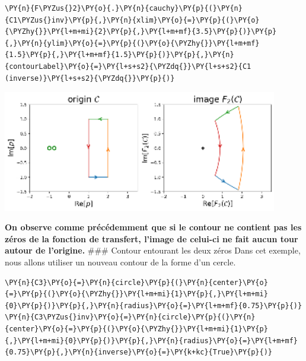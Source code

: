 \begin{tcolorbox}[breakable, size=fbox, boxrule=1pt, pad at break*=1mm,colback=cellbackground, colframe=cellborder]
\begin{Verbatim}[commandchars=\\\{\}]
\PY{n}{F\PYZus{}2}\PY{o}{.}\PY{n}{cauchy}\PY{p}{(}\PY{n}{C1\PYZus{}inv}\PY{p}{,}\PY{n}{xlim}\PY{o}{=}\PY{p}{(}\PY{o}{\PYZhy{}}\PY{l+m+mi}{2}\PY{p}{,}\PY{l+m+mf}{3.5}\PY{p}{)}\PY{p}{,}\PY{n}{ylim}\PY{o}{=}\PY{p}{(}\PY{o}{\PYZhy{}}\PY{l+m+mf}{1.5}\PY{p}{,}\PY{l+m+mf}{1.5}\PY{p}{)}\PY{p}{,}\PY{n}{contourLabel}\PY{o}{=}\PY{l+s+s2}{\PYZdq{}}\PY{l+s+s2}{C1 (inverse)}\PY{l+s+s2}{\PYZdq{}}\PY{p}{)}
\end{Verbatim}
\end{tcolorbox}
\begin{center}
    \includegraphics[width=0.9\textwidth]{notebook/fig/output_25_1.eps}
\end{center}
\textbf{On observe comme précédemment que si le contour ne contient pas
les zéros de la fonction de transfert, l'image de celui-ci ne fait aucun
tour autour de l'origine.} \#\#\# Contour entourant les deux zéros Dans
cet exemple, nous allons utiliser un nouveau contour de la forme d'un
cercle.
\begin{tcolorbox}[breakable, size=fbox, boxrule=1pt, pad at break*=1mm,colback=cellbackground, colframe=cellborder]
\begin{Verbatim}[commandchars=\\\{\}]
\PY{n}{C3}\PY{o}{=}\PY{n}{circle}\PY{p}{(}\PY{n}{center}\PY{o}{=}\PY{p}{(}\PY{o}{\PYZhy{}}\PY{l+m+mi}{1}\PY{p}{,}\PY{l+m+mi}{0}\PY{p}{)}\PY{p}{,}\PY{n}{radius}\PY{o}{=}\PY{l+m+mf}{0.75}\PY{p}{)}
\PY{n}{C3\PYZus{}inv}\PY{o}{=}\PY{n}{circle}\PY{p}{(}\PY{n}{center}\PY{o}{=}\PY{p}{(}\PY{o}{\PYZhy{}}\PY{l+m+mi}{1}\PY{p}{,}\PY{l+m+mi}{0}\PY{p}{)}\PY{p}{,}\PY{n}{radius}\PY{o}{=}\PY{l+m+mf}{0.75}\PY{p}{,}\PY{n}{inverse}\PY{o}{=}\PY{k+kc}{True}\PY{p}{)}
\end{Verbatim}
\end{tcolorbox}
